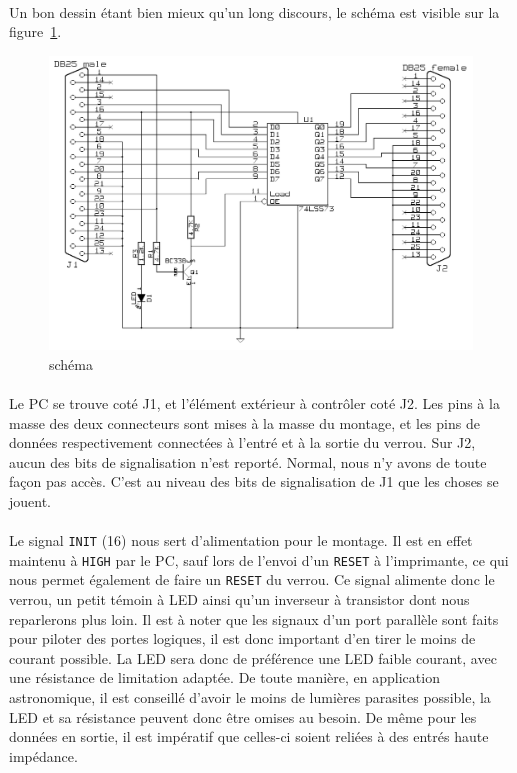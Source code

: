 \documentclass[11pt,a4paper]{book}
\begin{document}
 \paragraph*{}
 Un bon dessin \'etant bien mieux qu'un long discours, le sch\'ema est visible sur la figure~\ref{latch1}.
 
 \begin{figure}
 \center
 \includegraphics[scale=1.1]{./medias/latch1.png}
 \caption{sch\'ema}
 \label{latch1}
 \end{figure}
 
\paragraph*{}
Le PC se trouve cot\'e J1, et l'\'el\'ement ext\'erieur \`a contr\^oler cot\'e J2. Les pins \`a
la masse des deux connecteurs sont mises \`a la masse du montage, et les pins de donn\'ees 
respectivement connect\'ees \`a l'entr\'e et \`a la sortie du verrou. Sur J2, aucun des bits
de signalisation n'est report\'e. Normal, nous n'y avons de toute fa\c{c}on pas acc\`es.
C'est au niveau des bits de signalisation de J1 que les choses se jouent.

\paragraph*{}
Le signal {\tt INIT} (16) nous sert d'alimentation pour le montage. Il est en effet maintenu \`a
{\tt HIGH} par le PC, sauf lors de l'envoi d'un {\tt RESET} \`a l'imprimante, ce qui nous permet 
\'egalement de faire un {\tt RESET} du verrou. Ce signal alimente donc le verrou, un petit t\'emoin
\`a LED ainsi qu'un inverseur \`a transistor dont nous reparlerons plus loin. Il est \`a noter
que les signaux d'un port parall\`ele sont faits pour piloter des portes logiques, il est donc 
important d'en tirer le moins de courant possible. La LED sera donc de pr\'ef\'erence une LED
faible courant, avec une r\'esistance de limitation adapt\'ee. De toute mani\`ere, en application
astronomique, il est conseill\'e d'avoir le moins de lumi\`eres parasites possible, la LED et sa r\'esistance 
peuvent donc \^etre omises au besoin. De m\^eme pour les donn\'ees en sortie, il est imp\'eratif que 
celles-ci soient reli\'ees \`a des entr\'es haute imp\'edance.
\end{document}
